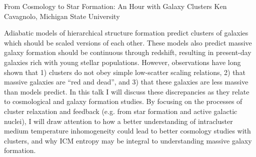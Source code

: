 From Cosmology to Star Formation: An Hour with Galaxy Clusters
Ken Cavagnolo, Michigan State University

Adiabatic models of hierarchical structure formation predict clusters
of galaxies which should be scaled versions of each other. These
models also predict massive galaxy formation should be continuous
through redshift, resulting in present-day galaxies rich with young
stellar populations. However, observations have long shown that 1)
clusters do not obey simple low-scatter scaling relations, 2) that
massive galaxies are ``red and dead'', and 3) that these galaxies are
less massive than models predict. In this talk I will discuss these
discrepancies as they relate to cosmological and galaxy formation
studies. By focusing on the processes of cluster relaxation and
feedback (e.g. from star formation and active galactic nuclei), I will
draw attention to how a better understanding of intracluster medium
temperature inhomogeneity could lead to better cosmology studies with
clusters, and why ICM entropy may be integral to understanding massive
galaxy formation.

